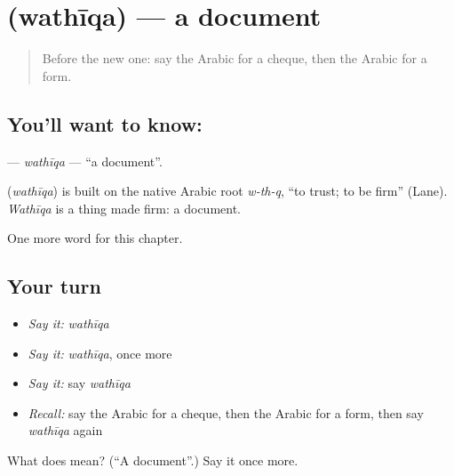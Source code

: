 \section[\texorpdfstring{\ar{وثيقة} (wathīqa)}{وثيقة (wathīqa)}]{ (wathīqa) — a document}

\label{lesson:AR-C183-wathiqa}



\begin{quote}
Before the new one: say the Arabic for a cheque, then the Arabic for a form.
\end{quote}

\subsection*{You'll want to know: }
\textbf{} — \emph{wathīqa} — \textquotedblleft{}a document\textquotedblright{}.

\begin{cousinweb}
\textbf{} (\emph{wathīqa}) is built on the native Arabic root \emph{w-th-q}, \textquotedblleft{}to trust; to be firm\textquotedblright{} (Lane). \emph{Wathīqa} is a thing made firm: a document.
\end{cousinweb}

\begin{grammarlens}[title={What you've built}]
One more word for this chapter.
\end{grammarlens}

\subsection*{Your turn}
\begin{itemize}
\raggedright
  \item \emph{Say it:} \emph{wathīqa}
  \item \emph{Say it:} \emph{wathīqa}, once more
  \item \emph{Say it:} say \emph{wathīqa}
  \item \emph{Recall:} say the Arabic for a cheque, then the Arabic for a form, then say \emph{wathīqa} again
\end{itemize}

\begin{tcolorbox}[breakable,colback=teal!4,colframe=teal!35!black,title={Before you move on}]
What does  mean? (\textquotedblleft{}A document\textquotedblright{}.) Say it once more.
\end{tcolorbox}
